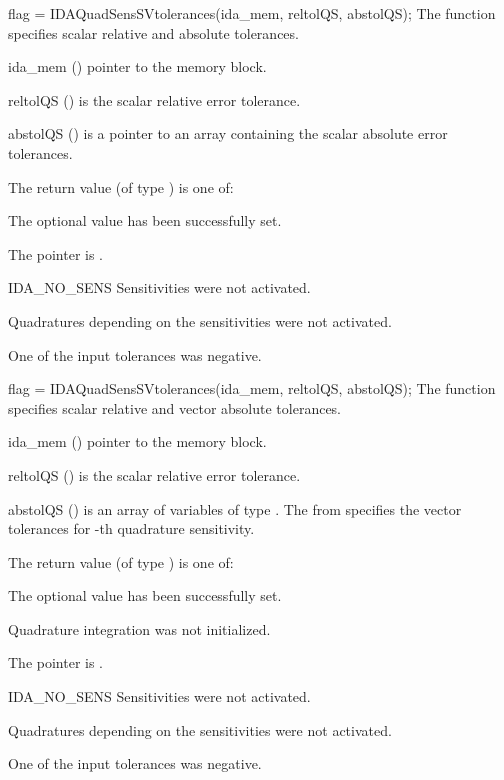{
 flag = IDAQuadSensSVtolerances(ida\_mem, reltolQS, abstolQS);
}
{
  The function  specifies scalar relative and absolute
  tolerances.
}
{
  \begin{args}[abstolQS]
  \item[ida\_mem] ()
    pointer to the {\idas} memory block.
  \item[reltolQS] ()
    is the scalar relative error tolerance.
  \item[abstolQS] ()
    is a pointer to an array containing the scalar absolute 
    error tolerances.
  \end{args}
}
{
  The return value  (of type ) is one of:
  \begin{args}
  \item[\Id{IDA\_SUCCESS}] 
    The optional value has been successfully set.
  \item[\Id{IDA\_MEM\_NULL}]
    The  pointer is .
  \item[IDA\_NO\_SENS]
    Sensitivities were not activated.
  \item[\Id{IDA\_NO\_QUADSENS}] 
    Quadratures depending on the sensitivities were not activated.
  \item[\Id{IDA\_ILL\_INPUT}] 
    One of the input tolerances was negative.
  \end{args}
}
{}

{
 flag = IDAQuadSensSVtolerances(ida\_mem, reltolQS, abstolQS);
}
{
  The function  specifies scalar relative and 
  vector absolute tolerances.
}
{
  \begin{args}[reltolQS]
  \item[ida\_mem] ()
    pointer to the {\idas} memory block.
  \item[reltolQS] ()
    is the scalar relative error tolerance.
  \item[abstolQS] ()
    is an array of  variables of type . The  from
     specifies the vector tolerances for -th quadrature 
    sensitivity.
  \end{args}
}
{
  The return value  (of type ) is one of:
  \begin{args}
  \item[\Id{IDA\_SUCCESS}] 
    The optional value has been successfully set.
  \item[\Id{IDA\_NO\_QUAD}]
    Quadrature integration was not initialized.
  \item[\Id{IDA\_MEM\_NULL}]
    The  pointer is .
  \item[IDA\_NO\_SENS]
    Sensitivities were not activated.
  \item[\Id{IDA\_NO\_QUADSENS}] 
    Quadratures depending on the sensitivities were not activated.
  \item[\Id{IDA\_ILL\_INPUT}] 
    One of the input tolerances was negative.
  \end{args}
}
{}


